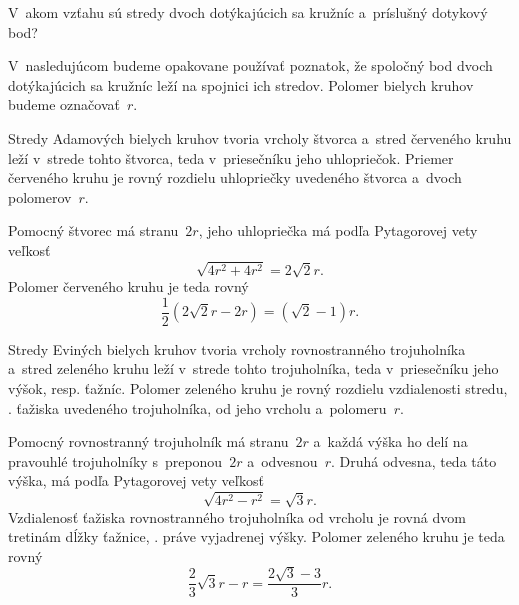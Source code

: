 {%
\napad
V~akom vzťahu sú stredy dvoch dotýkajúcich sa kružníc a~príslušný dotykový bod?

\riesenie
V~nasledujúcom budeme opakovane používať poznatok, že spoločný bod dvoch dotýkajúcich sa kružníc leží na spojnici ich stredov.
Polomer bielych kruhov budeme označovať~$r$.

Stredy Adamových bielych kruhov tvoria vrcholy štvorca a~stred červeného kruhu leží v~strede tohto štvorca, teda v~priesečníku jeho uhlopriečok.
Priemer červeného kruhu je rovný rozdielu uhlopriečky uvedeného štvorca a~dvoch polomerov~$r$.
%


Pomocný štvorec má stranu~$2r$, jeho uhlopriečka má podľa Pytagorovej vety veľkosť
$$
\sqrt{4r^2+4r^2}=2\sqrt2r.
$$
Polomer červeného kruhu je teda rovný
$$
\frac12(2\sqrt2r-2r)=(\sqrt2-1)r.
$$

Stredy Eviných bielych kruhov tvoria vrcholy rovnostranného trojuholníka a~stred zeleného kruhu leží v~strede tohto trojuholníka, teda v~priesečníku jeho výšok, resp. ťažníc.
Polomer zeleného kruhu je rovný rozdielu vzdialenosti stredu, \tj. ťažiska uvedeného trojuholníka, od jeho vrcholu a~polomeru~$r$.
%


Pomocný rovnostranný trojuholník má stranu~$2r$
a~každá výška ho delí na pravouhlé trojuholníky s~preponou~$2r$ a~odvesnou~$r$.
Druhá odvesna, teda táto výška, má podľa Pytagorovej vety veľkosť
$$
\sqrt{4r^2-r^2}=\sqrt3r.
$$
Vzdialenosť ťažiska rovnostranného trojuholníka od vrcholu je rovná dvom tretinám dĺžky ťažnice, \tj. práve vyjadrenej výšky.
Polomer zeleného kruhu je teda rovný
$$
\frac23\sqrt3r-r=\frac{2\sqrt3-3}{3}r.
$$

}

